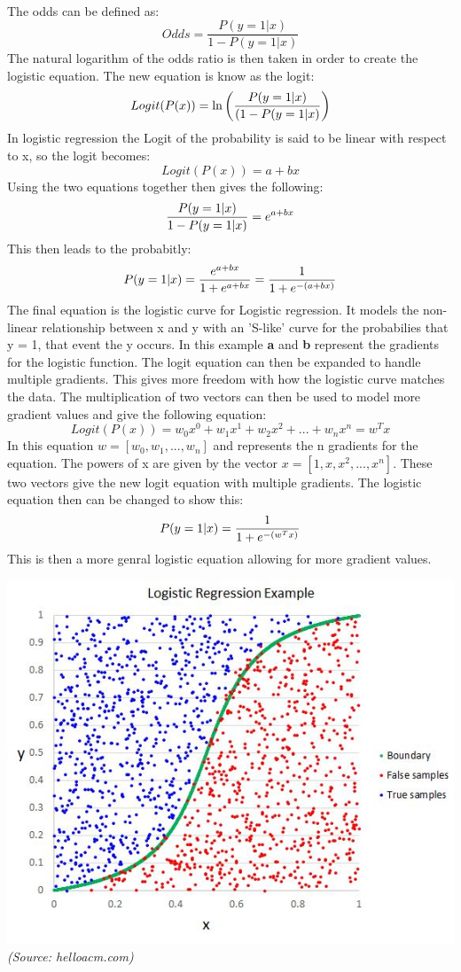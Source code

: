 \\
The odds can be defined as:\\
$$
Odds = \frac{P(y = 1|x)}{1 - P(y = 1|x)}
$$
The natural logarithm of the odds ratio is then taken in order to create the logistic equation. The new equation is know as the logit:\\
$$
Logit(P(x)) = \ln \left ( {P(y = 1|x) \over (1 - P(y = 1|x) } \right)
$$
In logistic regression the Logit of the probability is said to be linear with respect to x, so the logit becomes:\\
$$
Logit(P(x)) = a + bx
$$
Using the two equations together then gives the following:\\
$$
{P(y = 1|x) \over 1 - P(y = 1|x)} = e^{a+bx}
$$
This then leads to the probabitly:\\
$$
P(y=1|x) = {e^{a+bx} \over 1 + e^{a+bx}} = {1 \over 1 + e^{-(a + bx)}}
$$
The final equation is the logistic curve for Logistic regression. It models the non-linear relationship between x and y with an 'S-like' curve for the probabilies that y = 1, that event the y occurs. In this example \textbf{a} and \textbf{b} represent the gradients for the logistic function. The logit equation can then be expanded to handle multiple gradients. This gives more freedom with how the logistic curve matches the data. The multiplication of two vectors can then be used to model more gradient values and give the following equation:\\
$$
Logit(P(x)) = w_0x^0 + w_1x^1 + w_2x^2 + ... + w_nx^n = w^Tx
$$
In this equation $w = [w_{0}, w_{1}, ..., w_{n}]$ and represents the n gradients for the equation. The powers of x are given by the vector $x = [1, x, x^{2}, ..., x^{n}]$. These two vectors give the new logit equation with multiple gradients. The logistic equation then can be changed to show this:\\
$$
P(y=1|x) = {1 \over 1 + e^{-(w^Tx)}}
$$
This is then a more genral logistic equation allowing for more gradient values.\\
\begin{center}
\includegraphics[scale=0.8]{logistic-regression}\\
\textit{(Source: helloacm.com)}
\end{center}
